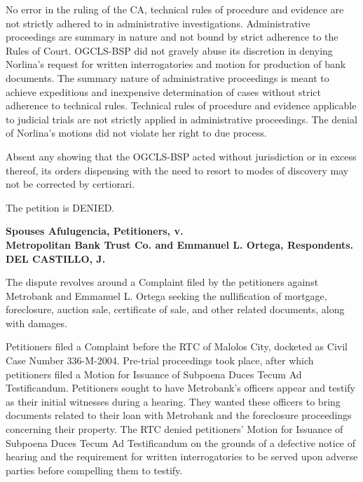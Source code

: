 \documentclass[
12pt,
oneside,
onehalfspacing,
headsepline
]{DigestCollection}
\begin{document}
No error in the ruling of the CA, technical rules of procedure and evidence are not strictly adhered to in administrative investigations. Administrative proceedings are summary in nature and not bound by strict adherence to the Rules of Court. OGCLS-BSP did not gravely abuse its discretion in denying Norlina's request for written interrogatories and motion for production of bank documents. The summary nature of administrative proceedings is meant to achieve expeditious and inexpensive determination of cases without strict adherence to technical rules. Technical rules of procedure and evidence applicable to judicial trials are not strictly applied in administrative proceedings. The denial of Norlina's motions did not violate her right to due process. 

Absent any showing that the OGCLS-BSP acted without jurisdiction or in excess thereof, its orders dispensing with the need to resort to modes of discovery may not be corrected by certiorari.

The petition is DENIED. 

\label{27c01930-0a10-11ef-932c-63c852f65e48}


\noindent\textbf{Spouses Afulugencia, Petitioners, v. \\Metropolitan Bank Trust Co. and Emmanuel L. Ortega, Respondents. DEL CASTILLO, J.}\vspace{0.4cm}

The dispute revolves around a Complaint filed by the petitioners against Metrobank and Emmanuel L. Ortega seeking the nullification of mortgage, foreclosure, auction sale, certificate of sale, and other related documents, along with damages.

Petitioners filed a Complaint before the RTC of Malolos City, docketed as Civil Case Number 336-M-2004. Pre-trial proceedings took place, after which petitioners filed a Motion for Issuance of Subpoena Duces Tecum Ad Testificandum. Petitioners sought to have Metrobank's officers appear and testify as their initial witnesses during a hearing. They wanted these officers to bring documents related to their loan with Metrobank and the foreclosure proceedings concerning their property. The RTC denied petitioners' Motion for Issuance of Subpoena Duces Tecum Ad Testificandum on the grounds of a defective notice of hearing and the requirement for written interrogatories to be served upon adverse parties before compelling them to testify.
\end{document}

